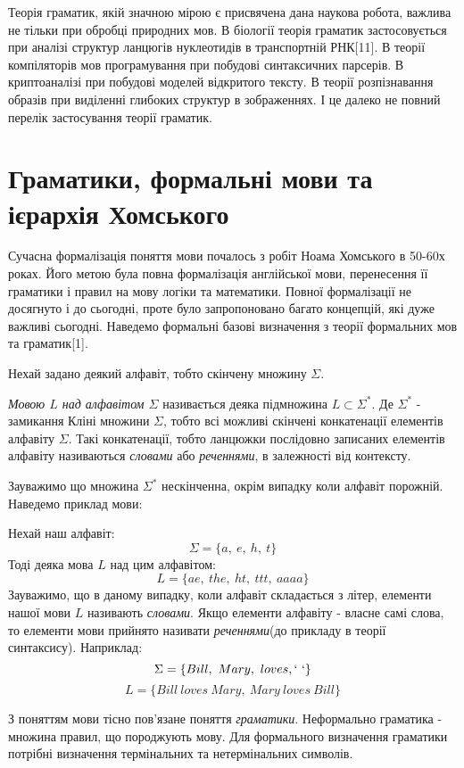 Теорія граматик, якій значною мірою є присвячена дана наукова робота, важлива не тільки при обробці природних мов. В біології теорія граматик
застосовується при аналізі структур ланцюгів нуклеотидів в транспортній РНК[11]. В теорії компіляторів мов програмування при побудові синтаксичних парсерів.
В криптоаналізі при побудові моделей відкритого тексту. В теорії розпізнавання образів при виділенні глибоких структур в зображеннях. І це
далеко не повний перелік застосування теорії граматик.

\section{Граматики, формальні мови та ієрархія Хомського}

Сучасна формалізація поняття мови почалось з робіт Ноама Хомського в 50-60х роках. Його метою була повна формалізація англійської мови, перенесення
її граматики і правил на мову логіки та математики. Повної формалізації не досягнуто і до сьогодні, проте було запропоновано багато концепцій,
які дуже важливі сьогодні. Наведемо формальні базові визначення з теорії формальних мов та граматик[1].

Нехай задано деякий алфавіт, тобто скінчену множину $ \Sigma $.
\begin{definition}
  \textit{Мовою $L$ над алфавітом $\Sigma$} називається деяка підмножина $ L \subset \Sigma^* $. Де $ \Sigma^* $ - замикання Кліні множини $ \Sigma $,
  тобто всі можливі скінчені конкатенації елементів алфавіту $ \Sigma $. Такі конкатенації, тобто ланцюжки послідовно записаних елементів алфавіту називаються
  \textit{словами} або \textit{реченнями}, в залежності від контексту.
\end{definition}
Зауважимо що множина $ \Sigma^* $ нескінченна, окрім випадку коли алфавіт порожній. Наведемо приклад мови:
\begin{example}
Нехай наш алфавіт:
$$ \Sigma = \{ a,\ e,\ h,\ t \} $$
Тоді деяка мова $ L $ над цим алфавітом:
$$ L = \{ ae,\ the,\ ht,\ ttt,\ aaaa \} $$
Зауважимо, що в даному випадку, коли алфавіт складається з літер, елементи нашої мови $L$ називають \textit{словами}. Якщо елементи алфавіту - власне
самі слова, то елементи мови прийнято називати \textit{реченнями}(до прикладу в теорії синтаксису). Наприклад:
$$ \Sigma = \{ Bill,\ Mary,\ loves, `\ ` \} $$
$$ L = \{ Bill\ loves\ Mary,\ Mary\ loves\ Bill \} $$
\end{example}

З поняттям мови тісно пов'язане поняття \textit{граматики}. Неформально граматика - множина правил, що породжують мову. Для формального визначення
граматики потрібні визначення термінальних та нетермінальних символів.

